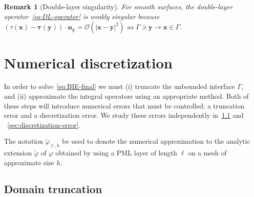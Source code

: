 \documentclass[11pt]{article}
\newcommand{\bn}{\mathbf{n}}
\newcommand{\bx}{\mathbf{x}}
\newcommand{\btau}{\boldsymbol{\tau}}
\newcommand{\by}{\mathbf{y}}
\newcommand{\tvarphi}{\tilde \varphi}
\newtheorem{remark}[theorem]{Remark}
\begin{document}
\begin{remark}[Double-layer singularity]
  For smooth surfaces, the double-layer operator~\cref{eq:DL-operator} is weakly
  singular because $(\tau(\bx) - \btau(\by)) \cdot \bn_{\by} = \mathcal{O}(|\bx
  - \by|^2)$ as $\Gamma \ni \by \to \bx \in \Gamma$.
\end{remark}

\section{Numerical discretization}

In order to solve~\cref{eq:BIE-final} we must (i) truncate the unbounded
interface $\Gamma$, and (ii) approximate the integral operators using an
appropriate method. Both of these steps will introduce numerical errors that must
be controlled: a truncation error and a discretization error. We study these
errors independently in~\cref{sec:truncation} and
~\cref{sec:discretization-error}. 

The notation $\tvarphi_{\ell,h}$ be used to denote the numerical approximation
to the analytic extension $\tvarphi$ of $\varphi$ obtained by using a PML layer
of length $\ell$ on a mesh of approximate size $h$. 

\subsection{Domain truncation}\label{sec:truncation}
\end{document}
